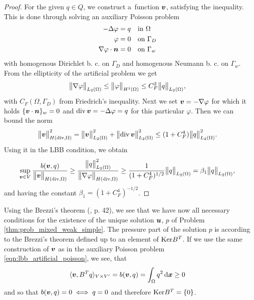 \begin{proof}
For the given $q\in Q$, we construct a~function $\mathbf{\boldsymbol{v}}$, satisfying the inequality.
This is done through solving an auxiliary Poisson problem
\begin{equation} \label{eqn:lbb_artificial_poisson}  
\begin{aligned}
    -\Delta\varphi &= q && \textrm{in } \Omega\\
    \varphi &= 0 && \textrm{on } \Gamma_D \\
    \nabla\varphi\cdot\mathbf{\boldsymbol{n}} &= 0 && \textrm{on } \Gamma_w
\end{aligned}
\end{equation}
with homogenous Dirichlet b. c. on $\Gamma_D$ and homogenous Neumann b. c. on $\Gamma_w$.
From the ellipticity of the artificial problem we get
\begin{equation}
    \bigl\Vert\nabla\varphi\bigr\Vert_{L_2(\Omega)} \leq \bigl\Vert\varphi\bigr\Vert_{H^1(\Omega)}
        \leq C_F^2 \bigl\Vert q\bigr\Vert_{L_2(\Omega)},
\end{equation}
with $C_F(\Omega,\Gamma_D)$ from Friedrich's inequality.
Next we set $\mathbf{\boldsymbol{v}} = -\nabla \varphi$ for which it holds $\{\mathbf{\boldsymbol{v}}\cdot\mathbf{\boldsymbol{n}}\}_w=0$
and ${\rm div}\,\mathbf{\boldsymbol{v}} = -\Delta\varphi=q$ for this particular $\varphi$. Then we can bound the norm
\begin{equation}
    \bigl\Vert\mathbf{\boldsymbol{v}}\bigr\Vert^2_{H({\rm div},\Omega)} = \bigl\Vert\mathbf{\boldsymbol{v}}\bigr\Vert^2_{L_2(\Omega)} 
        + \bigl\Vert{\rm div}\,\mathbf{\boldsymbol{v}}\bigr\Vert^2_{L_2(\Omega)}
        \leq (1+C_F^4) \bigl\Vert q\bigr\Vert^2_{L_2(\Omega)}.
\end{equation}
Using it in the LBB condition, we obtain
\begin{equation} \label{eqn:form_b_lbb_proof}
    \sup_{\mathbf{\boldsymbol{v}}\in V} \frac{b(\mathbf{\boldsymbol{v}},q)}{\bigl\Vert\mathbf{\boldsymbol{v}}\bigr\Vert_{H({\rm div},\Omega)}} \geq
    \frac{\bigl\Vert q\bigr\Vert^2_{L_2(\Omega)}}{\bigl\Vert\nabla\varphi\bigr\Vert_{H({\rm div},\Omega)}}
    \geq \frac{1}{(1+C_F^4)^{1/2}} \bigl\Vert q\bigr\Vert_{L_2(\Omega)} = \beta_1 \bigl\Vert q\bigr\Vert_{L_2(\Omega)},
\end{equation}
and having the constant $\beta_1 = (1+C_F^4)^{-1/2}$.
\end{proof}

Using the Brezzi's theorem (\cite{brezzi_mixed_1991}, p. 42), we see that we have now
all necessary conditions for the existence of the unique solution $\mathbf{\boldsymbol{u}}$, $p$ of Problem \eqref{thm:prob_mixed_weak_simple}.
The pressure part of the solution $p$ is according to the Brezzi's theorem defined up to an element of $\textrm{Ker} B^T$.
If we use the same construction of $\mathbf{\boldsymbol{v}}$ as in the auxiliary Poisson problem \eqref{eqn:lbb_artificial_poisson},
we see, that
\[
    \langle \mathbf{\boldsymbol{v}}, B^T q \rangle_{V\times V'} = b(\mathbf{\boldsymbol{v}},q) = \int_\Omega q^2 \,{\rm d}\mathbf{\boldsymbol{x}} \geq 0
\]
and so that $b(\mathbf{\boldsymbol{v}},q) = 0 \iff q=0$ and therefore $\textrm{Ker} B^T=\{0\}$.

